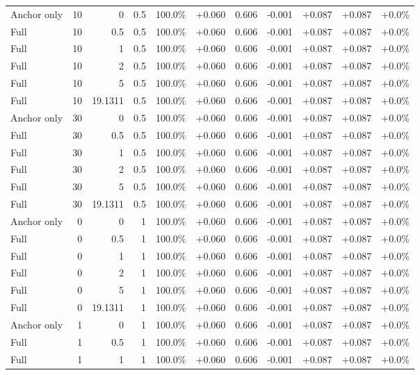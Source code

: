 \begin{table}[htbp]
\begin{tabular}{lrrrccccccc}
Anchor only & 10 & 0 & 0.5 & 100.0\% & +0.060 & 0.606 & -0.001 & +0.087 & +0.087 & +0.0\% \\
Full & 10 & 0.5 & 0.5 & 100.0\% & +0.060 & 0.606 & -0.001 & +0.087 & +0.087 & +0.0\% \\
Full & 10 & 1 & 0.5 & 100.0\% & +0.060 & 0.606 & -0.001 & +0.087 & +0.087 & +0.0\% \\
Full & 10 & 2 & 0.5 & 100.0\% & +0.060 & 0.606 & -0.001 & +0.087 & +0.087 & +0.0\% \\
Full & 10 & 5 & 0.5 & 100.0\% & +0.060 & 0.606 & -0.001 & +0.087 & +0.087 & +0.0\% \\
Full & 10 & 19.1311 & 0.5 & 100.0\% & +0.060 & 0.606 & -0.001 & +0.087 & +0.087 & +0.0\% \\
Anchor only & 30 & 0 & 0.5 & 100.0\% & +0.060 & 0.606 & -0.001 & +0.087 & +0.087 & +0.0\% \\
Full & 30 & 0.5 & 0.5 & 100.0\% & +0.060 & 0.606 & -0.001 & +0.087 & +0.087 & +0.0\% \\
Full & 30 & 1 & 0.5 & 100.0\% & +0.060 & 0.606 & -0.001 & +0.087 & +0.087 & +0.0\% \\
Full & 30 & 2 & 0.5 & 100.0\% & +0.060 & 0.606 & -0.001 & +0.087 & +0.087 & +0.0\% \\
Full & 30 & 5 & 0.5 & 100.0\% & +0.060 & 0.606 & -0.001 & +0.087 & +0.087 & +0.0\% \\
Full & 30 & 19.1311 & 0.5 & 100.0\% & +0.060 & 0.606 & -0.001 & +0.087 & +0.087 & +0.0\% \\
Anchor only & 0 & 0 & 1 & 100.0\% & +0.060 & 0.606 & -0.001 & +0.087 & +0.087 & +0.0\% \\
Full & 0 & 0.5 & 1 & 100.0\% & +0.060 & 0.606 & -0.001 & +0.087 & +0.087 & +0.0\% \\
Full & 0 & 1 & 1 & 100.0\% & +0.060 & 0.606 & -0.001 & +0.087 & +0.087 & +0.0\% \\
Full & 0 & 2 & 1 & 100.0\% & +0.060 & 0.606 & -0.001 & +0.087 & +0.087 & +0.0\% \\
Full & 0 & 5 & 1 & 100.0\% & +0.060 & 0.606 & -0.001 & +0.087 & +0.087 & +0.0\% \\
Full & 0 & 19.1311 & 1 & 100.0\% & +0.060 & 0.606 & -0.001 & +0.087 & +0.087 & +0.0\% \\
Anchor only & 1 & 0 & 1 & 100.0\% & +0.060 & 0.606 & -0.001 & +0.087 & +0.087 & +0.0\% \\
Full & 1 & 0.5 & 1 & 100.0\% & +0.060 & 0.606 & -0.001 & +0.087 & +0.087 & +0.0\% \\
Full & 1 & 1 & 1 & 100.0\% & +0.060 & 0.606 & -0.001 & +0.087 & +0.087 & +0.0\% \\

\end{tabular}
\end{table}
